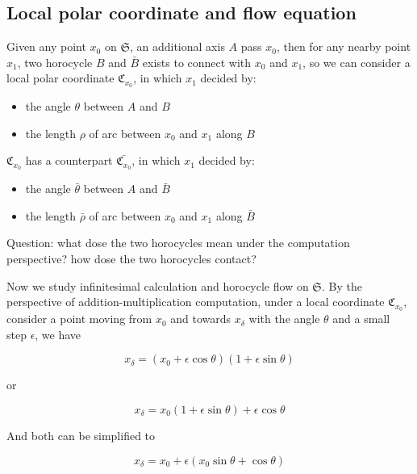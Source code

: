 \documentclass{article}
\begin{document}
\subsection{Local polar coordinate and flow equation}\label{sec:lpcafe}

Given any point $x_0$ on $\mathfrak{S}$, an additional axis $A$ pass $x_0$, then for any nearby point $x_1$, two
horocycle $B$ and $\bar{B}$ exists to connect with $x_0$ and $x_1$, so we can consider a local polar coordinate
$\mathfrak{C}_{x_0}$, in which $x_1$ decided by:
\begin{itemize}
    \item the angle $\theta$ between $A$ and $B$
    \item the length $\rho$ of arc between $x_0$ and $x_1$ along $B$
\end{itemize}

$\mathfrak{C}_{x_0}$ has a counterpart $\bar{\mathfrak{C}_{x_0}}$, in which $x_1$ decided by:
\begin{itemize}
    \item the angle $\bar{\theta}$ between $A$ and $\bar{B}$
    \item the length $\bar{\rho}$ of arc between $x_0$ and $x_1$ along $\bar{B}$
\end{itemize}

Question: what dose the two horocycles mean under the computation perspective? how dose the two horocycles contact?

Now we study infinitesimal calculation and horocycle flow on $\mathfrak{S}$. By the perspective of
addition-multiplication computation, under a local coordinate $\mathfrak{C}_{x_0}$,
consider a point moving from $x_0$ and towards $x_{\delta}$ with the angle $\theta$ and a small step $\epsilon$, we have

\begin{equation}
    x_{\delta} = (x_0 + \epsilon \cos \theta)(1 + \epsilon \sin \theta)
\end{equation}

or

\begin{equation}
    x_{\delta} = x_0 (1 + \epsilon \sin \theta) + \epsilon \cos \theta
\end{equation}

And both can be simplified to

\begin{equation}
    x_{\delta} = x_0 + \epsilon (x_0 \sin \theta + \cos \theta)
\end{equation}
\end{document}
